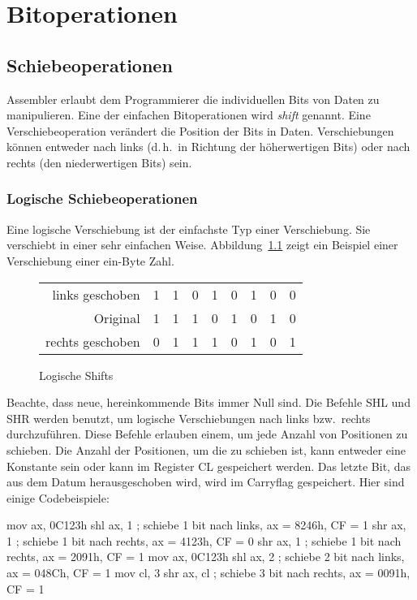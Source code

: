 \chapter{Bitoperationen}
\section{Schiebeoperationen}

Assembler erlaubt dem Programmierer die individuellen Bits von Daten
zu manipulieren. Eine der einfachen Bitoperationen wird \emph{shift}
genannt. Eine Verschiebeoperation ver\"{a}ndert die Position der Bits in
Daten. Verschiebungen k\"{o}nnen entweder nach links (d.\,h.\ in
Richtung der h\"{o}herwertigen Bits) oder nach rechts (den
niederwertigen Bits) sein.

\subsection{Logische Schiebeoperationen}

Eine logische Verschiebung ist der einfachste Typ einer
Verschiebung. Sie verschiebt in einer sehr einfachen Weise.
Abbildung~\ref{fig:logshifts} zeigt ein Beispiel einer Verschiebung
einer ein-Byte Zahl.

\begin{figure}[h]
\centering
\begin{tabular}{r|c|c|c|c|c|c|c|c|}
 \cline{2-9}
 links geschoben  & 1 & 1 & 0 & 1 & 0 & 1 & 0 & 0 \\
 \cline{2-9}
 $\;\;\;\;\;\;$Original         & 1 & 1 & 1 & 0 & 1 & 0 & 1 & 0 \\
 \cline{2-9}
 rechts geschoben & 0 & 1 & 1 & 1 & 0 & 1 & 0 & 1 \\
 \cline{2-9}
\end{tabular}
\caption{Logische Shifts \label{fig:logshifts}}
\end{figure}

Beachte, dass neue, hereinkommende Bits immer Null sind. Die Befehle
{\code SHL}  und {\code SHR}
 werden benutzt, um logische
Verschiebungen nach links bzw.\ rechts durchzuf\"{u}hren. Diese Befehle
erlauben einem, um jede Anzahl von Positionen zu schieben. Die
Anzahl der Positionen, um die zu schieben ist, kann entweder eine
Konstante sein oder kann im Register {\code CL} gespeichert werden.
Das letzte Bit, das aus dem Datum herausgeschoben wird, wird im
Carryflag gespeichert. Hier sind einige Codebeispiele:
\begin{AsmCodeListing}[frame=none, numbers=left]
      mov    ax, 0C123h
      shl    ax, 1            ; schiebe 1 bit nach links,  ax = 8246h, CF = 1
      shr    ax, 1            ; schiebe 1 bit nach rechts, ax = 4123h, CF = 0
      shr    ax, 1            ; schiebe 1 bit nach rechts, ax = 2091h, CF = 1
      mov    ax, 0C123h
      shl    ax, 2            ; schiebe 2 bit nach links,  ax = 048Ch, CF = 1
      mov    cl, 3
      shr    ax, cl           ; schiebe 3 bit nach rechts, ax = 0091h, CF = 1
\end{AsmCodeListing}

